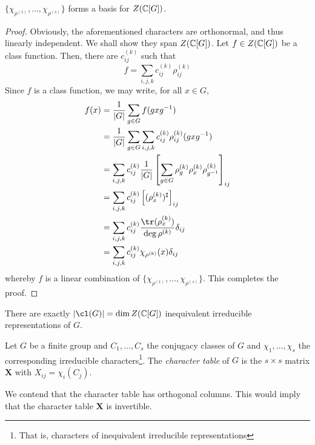 \begin{theorem}
    $\{\chi_{\rho^{(1)}},\ldots,\chi_{\rho^{(s)}}\}$ forms a basis for $Z(\mathbb{C}[G])$.
\end{theorem}
\begin{proof}
    Obviously, the aforementioned characters are orthonormal, and thus linearly independent. We shall show they span $Z(\mathbb{C}[G])$. Let $f\in Z(\mathbb{C}[G])$ be a class function. Then, there are $c_{ij}^{(k)}$ such that 
    \begin{equation*}
        f = \sum_{i,j,k}c_{ij}^{(k)}\rho_{ij}^{(k)}
    \end{equation*}
    Since $f$ is a class function, we may write, for all $x\in G$,
    \begin{align*}
        f(x) &= \frac{1}{|G|}\sum_{g\in G}f(gxg^{-1})\\
        &= \frac{1}{|G|}\sum_{g\in G}\sum_{i,j,k}c_{ij}^{(k)}\rho_{ij}^{(k)}(gxg^{-1})\\
        &= \sum_{i,j,k}c_{ij}^{(k)}\frac{1}{|G|}\left[\sum_{g\in G}\rho_g^{(k)}\rho_x^{(k)}\rho_{g^{-1}}^{(k)}\right]_{ij}\\
        &= \sum_{i,j,k}c_{ij}^{(k)}\left[(\rho_x^{(k)})^\sharp\right]_{ij}\\
        &= \sum_{i,j,k}c_{ij}^{(k)}\frac{\tr(\rho_x^{(k)})}{\deg\rho^{(k)}}\delta_{ij}\\
        &= \sum_{i,j,k}c_{ij}^{(k)}\chi_{\rho^{(k)}}(x)\delta_{ij}
    \end{align*}
    whereby $f$ is a linear combination of $\{\chi_{\rho^{(1)}},\ldots,\chi_{\rho^{(s)}}\}$. This completes the proof.
\end{proof}

\begin{corollary}
    There are exactly $|\cl(G)| = \dim Z(\bbC[G])$ inequivalent irreducible representations of $G$.
\end{corollary}

\begin{definition}
    Let $G$ be a finite group and $C_1,\ldots,C_s$ the conjugacy classes of $G$ and $\chi_1,\ldots,\chi_s$ the corresponding irreducible characters\footnote{That is, characters of inequivalent irreducible representations}. The \textit{character table} of $G$ is the $s\times s$ matrix $\mathbf X$ with $X_{ij} = \chi_i(C_j)$.
\end{definition}

We contend that the character table has orthogonal columns. This would imply that the character table $\mathbf X$ is invertible.


